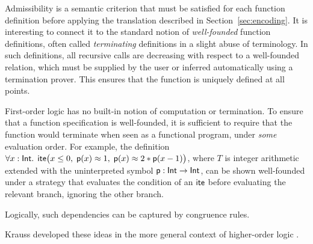 Admissibility is a semantic criterion that must be satisfied for each function
definition before applying the translation described in
Section~\ref{sec:encoding}. It is interesting to connect it to the
standard notion of \emph{well-founded} function definitions, often called
\emph{terminating} definitions in a slight abuse of terminology. In such
definitions, all recursive calls are decreasing with respect to a well-founded
relation, which must be supplied by the user or inferred automatically
using a termination prover. This ensures that the function is uniquely defined
at all points.

First-order logic has no built-in notion of computation or termination. To ensure
that a function specification is well-founded, it is sufficient to require that
the function would terminate when seen as a functional program, under \emph{some}
evaluation order. For example, the definition
$\forall x : {\mathsf{Int}}.\;\, \mathsf{ite}\bigl(
x \leq 0,\allowbreak\; \mathsf{p}( x ) \approx 1,\allowbreak\; \mathsf{p}( x ) \approx 2 * \mathsf{p}( x - 1 ) \bigr)$,
where $T$ is integer arithmetic extended with the uninterpreted symbol 
$\mathsf{p}:\mathsf{Int} \rightarrow \mathsf{Int}$, can be shown well-founded under a strategy that
evaluates the condition of an $\mathsf{ite}$ before evaluating the relevant branch,
ignoring the other branch. \begin{rep}Logically, such dependencies can be captured by
congruence rules. \end{rep}Krauss developed these ideas in the more general context of
higher-order logic \cite[Section 2]{krauss-2009-phd}.

